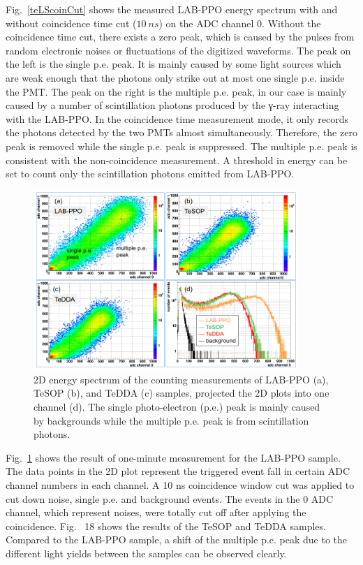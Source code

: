 Fig.~\ref{teLScoinCut} shows the measured LAB-PPO energy spectrum with and without coincidence time cut ($10~ns$) on the ADC channel 0.  Without the coincidence time cut, there exists a zero peak, which is caused by the pulses from random electronic noises or fluctuations of the digitized waveforms. The peak on the left is the single p.e. peak. It is mainly caused by some light sources which are weak enough that the photons only strike out at most one single p.e. inside the PMT\cite{leo2012techniques}.  The peak on the right is the multiple p.e. peak, in our case is mainly caused by a number of scintillation photons produced by the γ-ray interacting with the LAB-PPO. In the coincidence time measurement mode, it only records the photons detected by the two PMTs almost simultaneously. Therefore, the zero peak is removed while the single p.e. peak is suppressed. The multiple p.e. peak is consistent with the non-coincidence measurement. A threshold in energy can be set to count only the scintillation photons emitted from LAB-PPO. 


\begin{figure}[htbp]
	\centering	
	\includegraphics[width=10cm]{TeLS_2Denergy.png}
	\caption{ 2D energy spectrum of the counting measurements of LAB-PPO (a), TeSOP (b), and TeDDA (c) samples, projected the 2D plots into one channel (d). The single photo-electron (p.e.) peak is mainly caused by backgrounds while the multiple p.e. peak is from scintillation photons.}
	\label{teLSresults}
\end{figure}

Fig.~\ref{teLSresults} shows the result of one-minute measurement for the LAB-PPO sample. The data points in the 2D plot represent the triggered event fall in certain ADC channel numbers in each channel. A 10 ns coincidence window cut was applied to cut down noise, single p.e. and background events. The events in the 0 ADC channel, which represent noises, were totally cut off after applying the coincidence. Fig.~ 18 shows the results of the TeSOP and TeDDA samples.  Compared to the LAB-PPO sample, a shift of the multiple p.e. peak due to the different light yields between the samples can be observed clearly.

